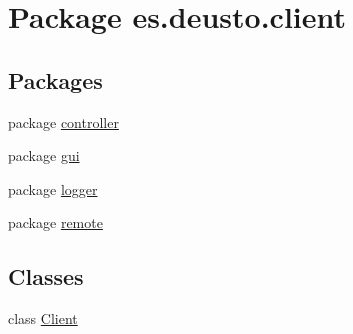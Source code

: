 \hypertarget{namespacees_1_1deusto_1_1client}{}\section{Package es.\+deusto.\+client}
\label{namespacees_1_1deusto_1_1client}
\subsection*{Packages}
\begin{DoxyCompactItemize}
\item 
package \mbox{\hyperlink{namespacees_1_1deusto_1_1client_1_1controller}{controller}}
\item 
package \mbox{\hyperlink{namespacees_1_1deusto_1_1client_1_1gui}{gui}}
\item 
package \mbox{\hyperlink{namespacees_1_1deusto_1_1client_1_1logger}{logger}}
\item 
package \mbox{\hyperlink{namespacees_1_1deusto_1_1client_1_1remote}{remote}}
\end{DoxyCompactItemize}
\subsection*{Classes}
\begin{DoxyCompactItemize}
\item 
class \mbox{\hyperlink{classes_1_1deusto_1_1client_1_1_client}{Client}}
\end{DoxyCompactItemize}
